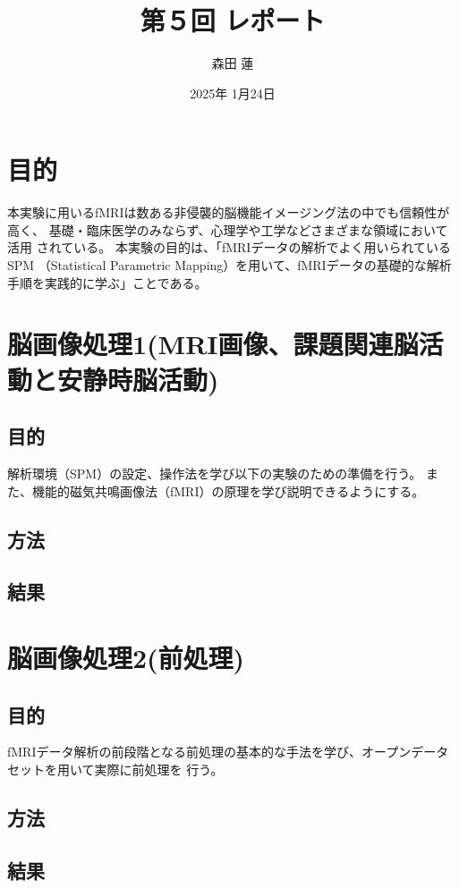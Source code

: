\documentclass{jlreq}
\title{第５回 レポート}
\author{森田 蓮}
\date{2025年 1月24日}
\begin{document}
\maketitle

\section{目的}
本実験に用いるfMRIは数ある非侵襲的脳機能イメージング法の中でも信頼性が高く、
基礎・臨床医学のみならず、心理学や工学などさまざまな領域において活用
されている。
本実験の目的は、「fMRIデータの解析でよく用いられているSPM
（Statistical Parametric Mapping）を用いて、fMRIデータの基礎的な解析
手順を実践的に学ぶ」ことである。

\section{脳画像処理1(MRI画像、課題関連脳活動と安静時脳活動)}
\subsection{目的}
解析環境（SPM）の設定、操作法を学び以下の実験のための準備を行う。
また、機能的磁気共鳴画像法（fMRI）の原理を学び説明できるようにする。
\subsection{方法}

\subsection{結果}

\section{脳画像処理2(前処理)}
\subsection{目的}
fMRIデータ解析の前段階となる前処理の基本的な手法を学び、オープンデータセットを用いて実際に前処理を
行う。
\subsection{方法}

\subsection{結果}
\end{document}
